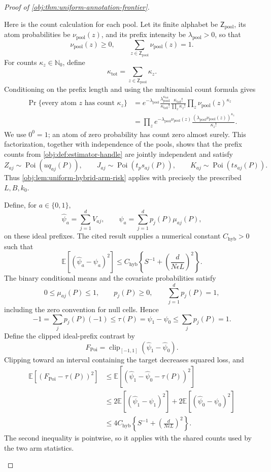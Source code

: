 \begin{proof}[Proof of \cref{obj:thm:uniform-annotation-frontier}]
\begin{enumerate}
Here is the count calculation for each pool. Let its finite alphabet be \(\mathsf Z_{\mathrm{pool}}\), its atom probabilities be \(\nu_{\mathrm{pool}}(z)\), and its prefix intensity be \(\lambda_{\mathrm{pool}}>0\), so that
\[
\nu_{\mathrm{pool}}(z)\ge0,\qquad
\sum_{z\in\mathsf Z_{\mathrm{pool}}}\nu_{\mathrm{pool}}(z)=1.
\]
For counts \(\kappa_z\in\mathbb N_0\), define
\[
\kappa_{\mathrm{tot}}
=\sum_{z\in\mathsf Z_{\mathrm{pool}}}\kappa_z.
\]
Conditioning on the prefix length and using the multinomial count formula gives
\[
\begin{aligned}
\Pr\{\text{every atom }z\text{ has count }\kappa_z\}
&=
e^{-\lambda_{\mathrm{pool}}}
\frac{\lambda_{\mathrm{pool}}^{\kappa_{\mathrm{tot}}}}
     {\kappa_{\mathrm{tot}}!}
\frac{\kappa_{\mathrm{tot}}!}{\prod_z\kappa_z!}
\prod_z\nu_{\mathrm{pool}}(z)^{\kappa_z}\\
&=
\prod_z
e^{-\lambda_{\mathrm{pool}}\nu_{\mathrm{pool}}(z)}
\frac{(\lambda_{\mathrm{pool}}\nu_{\mathrm{pool}}(z))^{\kappa_z}}
     {\kappa_z!}.
\end{aligned}
\]
We use \(0^0=1\); an atom of zero probability has count zero almost surely. This factorization, together with independence of the pools, shows that the prefix counts from \cref{obj:def:estimator-handle} are jointly independent and satisfy
\[
Z_{aj}\sim\operatorname{Poi}(uq_{aj}(P)),\qquad
J_{aj}\sim\operatorname{Poi}(t_ps_{aj}(P)),\qquad
K_{aj}\sim\operatorname{Poi}(ts_{aj}(P)).
\]
Thus \cref{obj:lem:uniform-hybrid-arm-risk} applies with precisely the prescribed \(L,B,k_0\).

Define, for \(a\in\{0,1\}\),
\[
\widehat\psi_a=\sum_{j=1}^dV_{aj},
\qquad
\psi_a=\sum_{j=1}^dp_j(P)\mu_{aj}(P),
\]
on these ideal prefixes. The cited result supplies a numerical constant \(C_{\mathrm{hyb}}>0\) such that
\[
\mathbb E[(\widehat\psi_a-\psi_a)^2]
\le
C_{\mathrm{hyb}}
\left\{S^{-1}+\left(\frac d{N\epsilon L}\right)^2\right\}.
\]
The binary conditional means and the covariate probabilities satisfy
\[
0\le\mu_{aj}(P)\le1,\qquad
p_j(P)\ge0,\qquad
\sum_{j=1}^dp_j(P)=1,
\]
including the zero convention for null cells. Hence
\[
-1
=\sum_jp_j(P)(-1)
\le\tau(P)
=\psi_1-\psi_0
\le\sum_jp_j(P)=1.
\]
Define the clipped ideal-prefix contrast by
\[
F_{\mathrm{Poi}}
=\operatorname{clip}_{[-1,1]}(\widehat\psi_1-\widehat\psi_0).
\]
Clipping toward an interval containing the target decreases squared loss, and
\[
\begin{aligned}
\mathbb E[(F_{\mathrm{Poi}}-\tau(P))^2]
&\le
\mathbb E[(\widehat\psi_1-\widehat\psi_0-\tau(P))^2]\\
&\le
2\mathbb E[(\widehat\psi_1-\psi_1)^2]
+2\mathbb E[(\widehat\psi_0-\psi_0)^2]\\
&\le
4C_{\mathrm{hyb}}
\left\{S^{-1}+\left(\frac d{N\epsilon L}\right)^2\right\}.
\end{aligned}
\]
The second inequality is pointwise, so it applies with the shared counts used by the two arm statistics.


\end{enumerate}
\end{proof}
